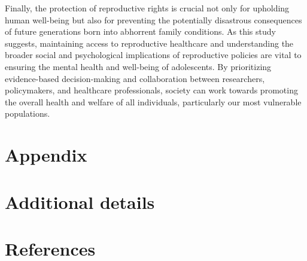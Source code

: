 \documentclass[
  letterpaper,
  DIV=11,
  numbers=noendperiod]{scrartcl}
\begin{document}
Finally, the protection of reproductive rights is crucial not only for
upholding human well-being but also for preventing the potentially
disastrous consequences of future generations born into abhorrent family
conditions. As this study suggests, maintaining access to reproductive
healthcare and understanding the broader social and psychological
implications of reproductive policies are vital to ensuring the mental
health and well-being of adolescents. By prioritizing evidence-based
decision-making and collaboration between researchers, policymakers, and
healthcare professionals, society can work towards promoting the overall
health and welfare of all individuals, particularly our most vulnerable
populations.

\newpage

\appendix

\hypertarget{appendix}{%
\section*{Appendix}\label{appendix}}

\hypertarget{additional-details}{%
\section{Additional details}\label{additional-details}}

\newpage

\hypertarget{references}{%
\section*{References}\label{references}}
\end{document}
